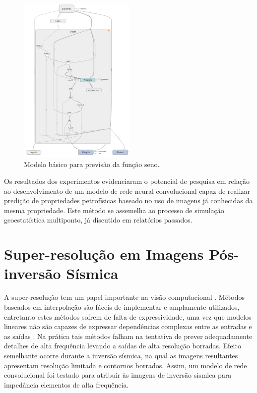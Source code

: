 \documentclass[11pt]{article}
\begin{document}
\begin{figure}[htp]
\begin{center}
  \includegraphics[width=0.5\textwidth]{fig/modelo}
  \caption{Modelo básico para previsão da função seno.}
  \label{fig:model}
\end{center}
\end{figure}

Os resultados dos experimentos evidenciaram o potencial de pesquisa em relação
ao desenvolvimento de um modelo de rede neural convolucional capaz de realizar
predição de propriedades petrofísicas baseado no uso de imagens já conhecidas da
mesma propriedade. Este método se assemelha ao processo de simulação geoestatística
multiponto, já discutido em relatórios passados.

\section{Super-resolução em Imagens Pós-inversão Sísmica}
A super-resolução tem um papel importante na visão computacional \cite{DongLoy2016}.
Métodos baseados em interpolação são fáceis de implementar e amplamente utilizados,
entretanto estes métodos sofrem de falta de expressividade, uma vez que modelos lineares
não são capazes de expressar dependências complexas entre as entradas e as saídas \cite{HsiehAndrews1978}.
Na prática tais métodos falham na tentativa de prever adequadamente detalhes de alta frequência
levando a saídas de alta resolução borradas. Efeito semelhante ocorre durante a inversão sísmica,
na qual as imagens resultantes apresentam resolução limitada e contornos borrados. Assim, um modelo
de rede convolucional foi testado para atribuir às imagens de inversão sísmica para impedância
elementos de alta frequência.
\end{document}
